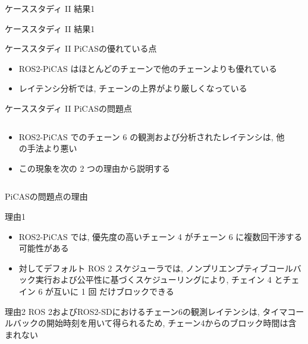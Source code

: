 \begin{frame}{ケーススタディ II 結果1}
\end{frame}

\begin{frame}{ケーススタディ II 結果1}
\end{frame}

\begin{frame}{ケーススタディ II PiCASの優れている点}
    \begin{itemize}
        \item ROS2-PiCAS はほとんどのチェーンで他のチェーンよりも優れている
        \item レイテンシ分析では, チェーンの上界がより厳しくなっている
    \end{itemize}
\end{frame}

\begin{frame}{ケーススタディ II PiCASの問題点}
    \begin{columns}
        \begin{column}{0.8\textwidth}
            \begin{itemize}
                \item ROS2-PiCAS でのチェーン 6 の観測および分析されたレイテンシは, 他の手法より悪い
                \item この現象を次の 2 つの理由から説明する
            \end{itemize}
        \end{column}
        \begin{column}{0.2\textwidth}
        \end{column}
    \end{columns}
\end{frame}

\begin{frame}{PiCASの問題点の理由}
    \vspace{1mm}
    \begin{block}{理由1}
        \setlength{\linewidth}{0.98\columnwidth}
        \begin{itemize}
            \item ROS2-PiCAS では, 優先度の高いチェーン 4 がチェーン 6 に複数回干渉する可能性がある
            \item 対してデフォルト ROS 2 スケジューラでは, ノンプリエンプティブコールバック実行および公平性に基づくスケジューリングにより, チェイン 4 とチェイン 6 が互いに 1 回 だけブロックできる
        \end{itemize}
    \end{block}
    \begin{block}{理由2}
        ROS 2およびROS2-SDにおけるチェーン6の観測レイテンシは, タイマコールバックの開始時刻を用いて得られるため, チェーン4からのブロック時間は含まれない
    \end{block}
\end{frame}

